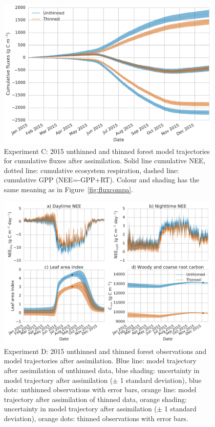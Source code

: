   \begin{figure}
 \noindent\includegraphics[width=40pc]{chapter/chapter7/cum_fluxc.pdf}
\caption{Experiment C: 2015 unthinned and thinned forest model trajectories for cumulative fluxes after assimilation. Solid line cumulative NEE, dotted line: cumulative ecosystem respiration, dashed line: cumulative GPP (NEE=-GPP+RT). Colour and shading has the same meaning as in Figure~\ref{fig:fluxcompa}.}
 \label{fig:fluxcumc}
 \end{figure}
 
 
  \begin{figure}
 \noindent\includegraphics[width=40pc]{chapter/chapter7/obs_compd.pdf}
\caption{Experiment D: 2015 unthinned and thinned forest observations and model trajectories after assimilation. Blue line: model trajectory after assimilation of unthinned data, blue shading: uncertainty in model trajectory after assimilation (\(\pm\) 1 standard deviation), blue dots: unthinned observations with error bars, orange line: model trajectory after assimilation of thinned data, orange shading: uncertainty in model trajectory after assimilation (\(\pm\) 1 standard deviation), orange dots: thinned observations with error bars.}
 \label{fig:obscompd}
 \end{figure}
 
